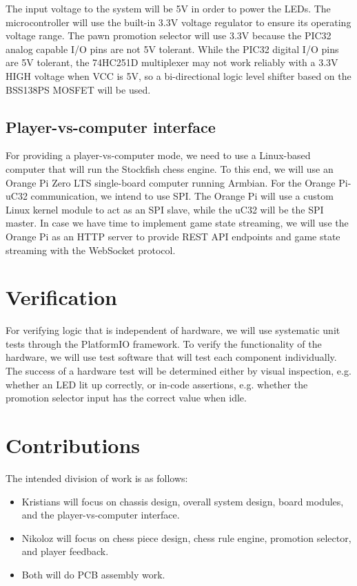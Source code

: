 \documentclass{article}
\begin{document}
The input voltage to the system will be 5V in order to power the LEDs. The microcontroller will use the built-in 3.3V voltage regulator to ensure its operating voltage range. The pawn promotion selector will use 3.3V because the PIC32 analog capable I/O pins are not 5V tolerant. While the PIC32 digital I/O pins are 5V tolerant, the 74HC251D multiplexer may not work reliably with a 3.3V HIGH voltage when VCC is 5V, so a bi-directional logic level shifter based on the BSS138PS MOSFET will be used.

\subsection*{Player-vs-computer interface}

For providing a player-vs-computer mode, we need to use a Linux-based computer that will run the Stockfish chess engine. To this end, we will use an Orange Pi Zero LTS single-board computer running Armbian. For the Orange Pi-uC32 communication, we intend to use SPI. The Orange Pi will use a custom Linux kernel module to act as an SPI slave, while the uC32 will be the SPI master. In case we have time to implement game state streaming, we will use the Orange Pi as an HTTP server to provide REST API endpoints and game state streaming with the WebSocket protocol.

\section{Verification}

For verifying logic that is independent of hardware, we will use systematic unit tests through the PlatformIO framework. To verify the functionality of the hardware, we will use test software that will test each component individually. The success of a hardware test will be determined either by visual inspection, e.g. whether an LED lit up correctly, or in-code assertions, e.g. whether the promotion selector input has the correct value when idle.

\section{Contributions}

The intended division of work is as follows:
\begin{itemize}
	\item Kristians will focus on chassis design, overall system design, board modules, and the player-vs-computer interface.
	\item Nikoloz will focus on chess piece design, chess rule engine, promotion selector, and player feedback.
	\item Both will do PCB assembly work.
\end{itemize}
\end{document}
